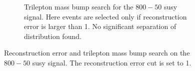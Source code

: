 \begin{figure}[h!]
\begin{subfigure}{.8\textwidth}
        \caption{Trilepton mass bump search for the $800-50$ susy signal. Here events are selected only if reconstruction error is larger than 1. No significant 
        separation of distribution found.}
        \label{fig:vae_susy_800_50_trilep}
    \end{subfigure}
    \hfill        
    \caption{ Reconstruction error and trilepton mass bump search on the $800-50$ susy signal. The reconstruction error cut is set to 1. }
    \label{fig:vae_susy_800_50_recon_trilep}
\end{figure}
